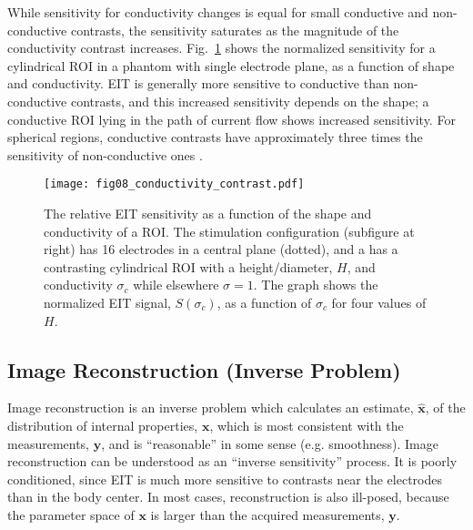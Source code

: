 \documentclass[10pt,journal]{IEEEtran}\def\TBLWIDA{15mm}\def\TBLWIDB{60mm}
\newcommand\Fref[1]{Fig.\ \ref{#1}}
\newcommand{\xB}{\mathbf{x}}
\newcommand{\xH}{\hat{\mathbf{x}}}
\newcommand{\yB}{\mathbf{y}}
\begin{document}
While sensitivity for conductivity changes is equal
for small conductive and non-conductive contrasts, the
sensitivity saturates as the magnitude of the
conductivity contrast increases.
\Fref{fig:perturbation_sensitivity} shows the 
normalized sensitivity for a cylindrical ROI in a
phantom with single electrode plane, as a function of
shape and conductivity.
 EIT is generally more sensitive
to conductive than non-conductive contrasts, and this
increased sensitivity
depends on the shape; a conductive ROI lying in the path
of current flow shows increased sensitivity.
For spherical regions, conductive contrasts have approximately
three times the sensitivity of non-conductive
ones \cite{Adler2015Perturbations}.

\begin{figure} \centering
   \texttt{[image: fig08\_conductivity\_contrast.pdf]}
\caption{%
The relative EIT sensitivity as a function of the shape and
conductivity of a ROI. The stimulation configuration (subfigure at right)
has 16 electrodes in a central plane (dotted), and a 
has a contrasting cylindrical ROI with a height/diameter, $H$, and conductivity 
$\sigma_c$ while elsewhere $\sigma=1$.
The graph shows the
normalized EIT signal, $S(\sigma_c)$, as a function of
$\sigma_c$ for four values of $H$.
}
\label{fig:perturbation_sensitivity}
\end{figure}

\subsection{Image Reconstruction (Inverse Problem)}

Image reconstruction is an inverse problem which calculates
an estimate, $\xH$, of 
the distribution of internal properties, $\xB$, which is most consistent
with the measurements, $\yB$, and is ``reasonable'' in some sense (e.g. smoothness). 
Image reconstruction can be understood as an ``inverse sensitivity''
process. It is poorly conditioned, since EIT is much more
sensitive to contrasts near the electrodes than in the body center.
In most cases, reconstruction is also ill-posed, because the
parameter space of $\xB$ is larger than the acquired measurements, $\yB$.
\end{document}
